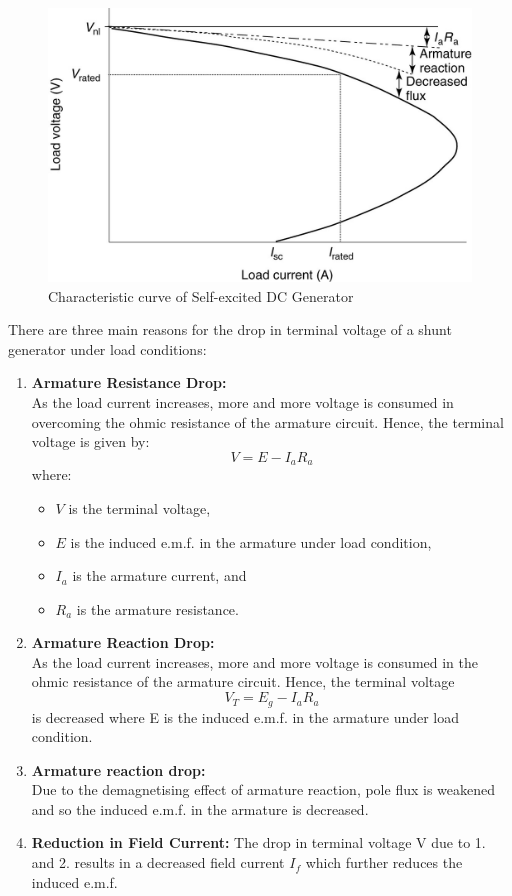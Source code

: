 \documentclass[a4paper,12pt]{article}
\begin{document}
\begin{figure}[H]
	\centering
	\includegraphics[width=0.5\linewidth]{Images/4}
	\caption{Characteristic curve of Self-excited DC Generator}
	\label{fig:volt-amp-characteristic-of-a-self-excited-dc-generator}
\end{figure}
There are three main reasons for the drop in terminal voltage of a shunt generator under load conditions:
\begin{enumerate}
	\item \textbf{Armature Resistance Drop:} \\
	As the load current increases, more and more voltage is consumed in overcoming the ohmic resistance of the armature circuit. Hence, the terminal voltage is given by:
	\[
	V = E - I_a R_a
	\]
	where:
	\begin{itemize}
		\item \( V \) is the terminal voltage,
		\item \( E \) is the induced e.m.f. in the armature under load condition,
		\item \( I_a \) is the armature current, and
		\item \( R_a \) is the armature resistance.
	\end{itemize}
	
	\item \textbf{Armature Reaction Drop:} \\
As the load current increases, more and more voltage is consumed in the ohmic resistance of the
armature circuit. Hence, the terminal voltage 	\[
V_T = E_g - I_a R_a
\] is decreased where E is the induced e.m.f.
in the armature under load condition.
	
	\item \textbf{Armature reaction drop:} \\
Due to the demagnetising effect of armature reaction, pole flux is weakened and so the induced
e.m.f. in the armature is decreased.
\item \textbf{Reduction in Field Current:}	The drop in terminal voltage V due to 1. and 2. results in a decreased field current $I_f$ which
	further reduces the induced e.m.f.
\end{enumerate}
\end{document}
